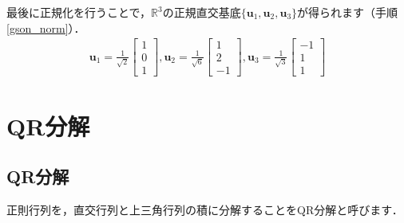 \documentclass[dvipdfmx]{jsarticle}
\theoremstyle{definition}
\begin{document}
最後に正規化を行うことで，$\mathbb{R}^3$の正規直交基底$\{ \bm{u}_1, \bm{u}_2, \bm{u}_3 \}$が得られます（手順\ref{gson_norm}）．
\begin{align*}
    \bm{u}_1 = \frac{1}{\sqrt{2}}\begin{bmatrix} 1 \\ 0 \\ 1 \end{bmatrix},
    \bm{u}_2 = \frac{1}{\sqrt{6}}\begin{bmatrix} 1 \\ 2 \\ -1 \end{bmatrix},
    \bm{u}_3 = \frac{1}{\sqrt{3}}\begin{bmatrix} -1 \\ 1 \\ 1 \end{bmatrix}
\end{align*}



\section{QR分解}  \label{sec_qrdecom}

\subsection{QR分解}  \label{subsec_qrdecom}
正則行列を，直交行列と上三角行列の積に分解することをQR分解と呼びます．
\end{document}

